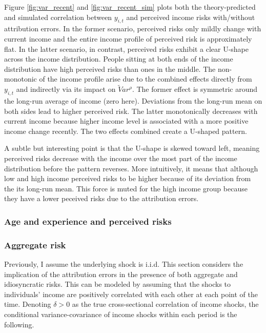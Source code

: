 \documentclass[12pt,notitlepage,onecolumn,aps,pra]{article}
\begin{document}
Figure \ref{fig:var_recent} and \ref{fig:var_recent_sim} plots both the
theory-predicted and simulated correlation between \(y_{i,t}\) and
perceived income risks with/without attribution errors. In the former
scenario, perceived risks only mildly change with current income and the
entire income profile of perceived risk is approximately flat. In the
latter scenario, in contrast, perceived risks exhibit a clear U-shape
across the income distribution. People sitting at both ends of the
income distribution have high perceived risks than ones in the middle.
The non-monotonic of the income profile arise due to the combined
effects directly from \(y_{i,t}\) and indirectly via its impact on
\(\tilde Var^{\rho}\). The former effect is symmetric around the
long-run average of income (zero here). Deviations from the long-run
mean on both sides lead to higher perceived risk. The latter
monotonically decreases with current income because higher income level
is associated with a more positive income change recently. The two
effects combined create a U-shaped pattern.

A subtle but interesting point is that the U-shape is skewed toward
left, meaning perceived risks decrease with the income over the most
part of the income distribution before the pattern reverses. More
intuitively, it means that although low and high income perceived risks
to be higher because of its deviation from the its long-run mean. This
force is muted for the high income group because they have a lower
peceived risks due to the attribution errors.


    \hypertarget{age-and-experience-and-perceived-risks}{%
\subsubsection{Age and experience and perceived
risks}\label{age-and-experience-and-perceived-risks}}



    \hypertarget{aggregate-risk}{%
\subsubsection{Aggregate risk}\label{aggregate-risk}}

Previously, I assume the underlying shock is i.i.d. This section
considers the implication of the attribution errors in the presence of
both aggregate and idiosyncratic risks. This can be modeled by assuming
that the shocks to individuals' income are positively correlated with
each other at each point of the time. Denoting \(\delta>0\) as the true
cross-sectional correlation of income shocks, the conditional
variance-covariance of income shocks within each period is the
following.
\end{document}
